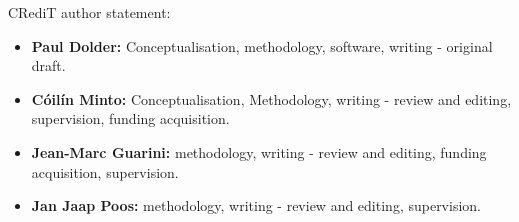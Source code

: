 \documentclass{article}
\begin{document}
CRediT author statement: 

\begin{itemize}
	\item \textbf{Paul Dolder:} Conceptualisation, methodology, software,
		writing - original draft. 
	\item \textbf{Cóilín Minto:} Conceptualisation, Methodology, writing - review
	and editing, supervision, funding acquisition. 
	\item \textbf{Jean-Marc Guarini:} methodology, writing - review and
		editing, funding acquisition, supervision. 
	\item \textbf{Jan Jaap Poos:} methodology, writing - review and
		editing, supervision. \

\end{itemize}
\end{document}
